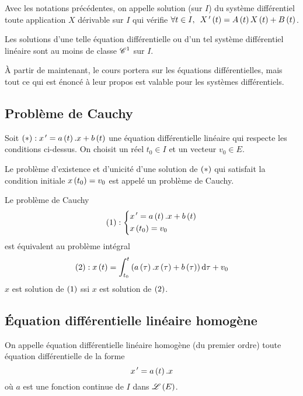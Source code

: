 \begin{defi}
Avec les notations précédentes, on appelle solution (sur \(I\)) du système différentiel toute application \(X\) dérivable sur \(I\) qui vérifie \(\quantifs{\forall t\in I}X\prim\paren{t}=A\paren{t}X\paren{t}+B\paren{t}\).
\end{defi}

\begin{prop}
Les solutions d'une telle équation différentielle ou d'un tel système différentiel linéaire sont au moins de classe \(\mathscr{C}^{1}\) sur \(I\).
\end{prop}

À partir de maintenant, le cours portera sur les équations différentielles, mais tout ce qui est énoncé à leur propos est valable pour les systèmes différentiels.

\subsection{Problème de Cauchy}

\begin{defi}
Soit \(\left(*\right):x^{\,\prime}=a\left(t\right).x+b\left(t\right)\) une équation différentielle linéaire qui respecte les conditions ci-dessus. On choisit un réel \(t_0\in I\) et un vecteur \(v_0\in E\).

Le problème d'existence et d'unicité d'une solution de \(\left(*\right)\) qui satisfait la condition initiale \(x\left(t_0\right)=v_0\) est appelé un problème de Cauchy.
\end{defi}

Le problème de Cauchy \[\left(1\right):\begin{dcases}
    x^{\,\prime}=a\left(t\right).x+b\left(t\right) \\
    x\left(t_0\right)=v_0
\end{dcases}\] est équivalent au problème intégral \[\paren{2}:x\paren{t}=\int_{t_0}^t\paren{a\paren{\tau}.x\paren{\tau}+b\paren{\tau}}\odif{\tau}+v_0\] \ie \(x\) est solution de \(\left(1\right)\) ssi \(x\) est solution de \(\left(2\right)\).

\subsection{Équation différentielle linéaire homogène}

\begin{defi}
On appelle équation différentielle linéaire homogène (du premier ordre) toute équation différentielle de la forme \[x^{\,\prime}=a\left(t\right).x\] où \(a\) est une fonction continue de \(I\) dans \(\mathscr{L}\left(E\right)\).
\end{defi}

